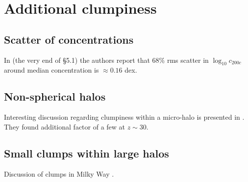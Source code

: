 
\section{Additional clumpiness}
\subsection{Scatter of concentrations}
In \cite{2014arXiv1407.4730D} (the very end of \S5.1) the authors report that 68\% rms scatter in $\log_{10}c_{200c}$ around median concentration is $\approx 0.16$ dex. 

\subsection{Non-spherical halos}
Interesting discussion regarding clumpiness within a micro-halo is presented in \citet{Anderhalden_2013}. They found additional factor of a few at $z \sim 30$.

\subsection{Small clumps within large halos}
Discussion of clumps in Milky Way \cite{Belotsky_2014}.